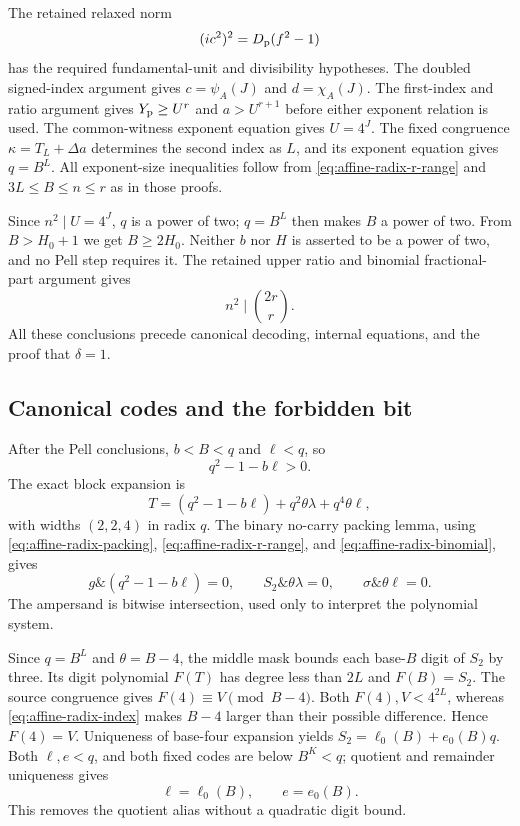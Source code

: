 The retained relaxed norm
\[
 (ic^2)^2=D_{\rm p}(f^2-1)
\]
has the required fundamental-unit and divisibility hypotheses.
The doubled signed-index argument gives $c=\psi_A(J)$ and
$d=\chi_A(J)$. The first-index and ratio argument gives
$Y_{\rm p}\ge U^r$ and $a>U^{r+1}$ before either exponent
relation is used. The common-witness exponent equation gives
$U=4^J$. The fixed congruence $\kappa=T_L+\Delta a$
determines the second index as $L$, and its exponent equation
gives $q=B^L$. All exponent-size inequalities follow from
\eqref{eq:affine-radix-r-range} and $3L\le B\le n\le r$
as in those proofs.

Since $n^2\mid U=4^J$, $q$ is a power of two; $q=B^L$ then
makes $B$ a power of two. From $B>H_0+1$ we get $B\ge2H_0$.
Neither $b$ nor $H$ is asserted to be a power of two, and no
Pell step requires it. The retained upper ratio and binomial
fractional-part argument gives
\begin{equation}\label{eq:affine-radix-binomial}
 n^2\mid\binom{2r}{r}.
\end{equation}
All these conclusions precede canonical decoding, internal
equations, and the proof that $\delta=1$.

\subsection{Canonical codes and the forbidden bit}

After the Pell conclusions, $b<B<q$ and $\ell<q$, so
\begin{equation}\label{eq:affine-radix-no-borrow}
 q^2-1-b\ell>0.
\end{equation}
The exact block expansion is
\[
 T=(q^2-1-b\ell)+q^2\theta\lambda+q^4\theta\ell,
\]
with widths $(2,2,4)$ in radix $q$. The binary no-carry
packing lemma, using \eqref{eq:affine-radix-packing},
\eqref{eq:affine-radix-r-range}, and
\eqref{eq:affine-radix-binomial}, gives
\begin{equation}\label{eq:affine-radix-masks}
 g\mathbin{\&}(q^2-1-b\ell)=0,\qquad
 S_2\mathbin{\&}\theta\lambda=0,\qquad
 \sigma\mathbin{\&}\theta\ell=0.
\end{equation}
The ampersand is bitwise intersection, used only to interpret
the polynomial system.

Since $q=B^L$ and $\theta=B-4$, the middle mask bounds each
base-$B$ digit of $S_2$ by three. Its digit polynomial $F(T)$
has degree less than $2L$ and $F(B)=S_2$. The source congruence
gives $F(4)\equiv V\pmod{B-4}$. Both $F(4),V<4^{2L}$,
whereas \eqref{eq:affine-radix-index} makes $B-4$ larger than
their possible difference. Hence $F(4)=V$. Uniqueness of
base-four expansion yields $S_2=\ell_0(B)+e_0(B)q$.
Both $\ell,e<q$, and both fixed codes are below $B^K<q$;
quotient and remainder uniqueness gives
\begin{equation}\label{eq:affine-radix-canonical}
 \ell=\ell_0(B),\qquad e=e_0(B).
\end{equation}
This removes the quotient alias without a quadratic digit bound.

